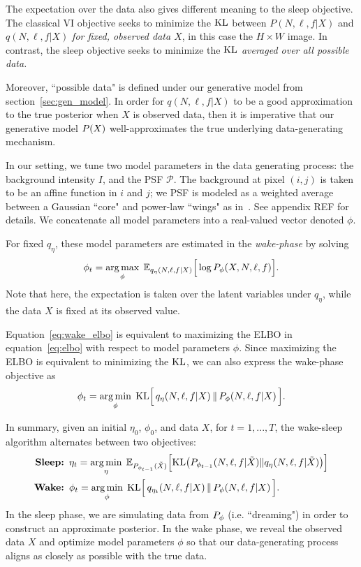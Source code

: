 The expectation over the data also gives different meaning to the sleep objective. The classical VI objective seeks to minimize the $\textrm{KL}$ between $P(N, \ell, f | X)$ and $q(N, \ell, f | X)$ {\itshape for fixed, observed data $X$}, 
in this case the $H\times W$ image. In contrast, the sleep objective seeks to minimize the $\textrm{KL}$ {\itshape averaged over all possible data. }

Moreover, ``possible data" is defined under our generative model from section~\ref{sec:gen_model}. In order for $q(N, \ell, f | X)$ to be a good approximation to
the true posterior when $X$ is observed data, then it is imperative that our generative model $P(X)$ well-approximates the true underlying data-generating mechanism. 

In our setting, we tune two model parameters in the data generating process: the background intensity $I$, and the PSF $\mathcal{P}$. The background at pixel $(i, j)$ is taken to be an affine function in $i$ and $j$; we PSF is modeled as a weighted average between a Gaussian ``core" and power-law ``wings" as in~\cite{Xin2018psf}. See appendix REF for details. We concatenate all model parameters into a real-valued vector denoted $\phi$. 

For fixed $q_\eta$, these model parameters are estimated in the {\itshape wake-phase} by solving 
\begin{align}
    \phi_{t} = \operatorname*{arg\,max}_{\phi} \; \mathbb{E}_{q_{\eta}(N, \ell, f | X)}\Big[\log P_\phi(X, N, \ell, f)\Big]. 
    \label{eq:wake_elbo}
\end{align}
Note that here, the expectation is taken over the latent variables under $q_\eta$, while the data $X$ is fixed at its observed value. 

Equation~\eqref{eq:wake_elbo} is equivalent to maximizing the ELBO in equation~\eqref{eq:elbo} with respect to model parameters $\phi$. 
Since maximizing the ELBO is equivalent to 
minimizing the $\textrm{KL}$, we can also express the wake-phase objective as 
\begin{align}
    \phi_{t} = \operatorname*{arg\,min}_{\phi} \; \mathrm{KL}\Big[\,q_\eta(N, \ell, f | X)\, \| \,P_\phi(N, \ell, f | X )\,\Big]. 
\end{align}

In summary, given an initial $\eta_0$, $\phi_0$, and data $X$,
for $t = 1, ..., T$, the wake-sleep algorithm alternates between two objectives: 
\begin{align}
    \text{{\bf Sleep: }} & 
    \eta_{t} = \operatorname*{arg\,min}_\eta \; \mathbb{E}_{P_{\phi_{t - 1}}(\tilde X)}\Big[\textrm{KL}\big ( P_{\phi_{t - 1}}(N, \ell, f | \tilde X)\| q_{\eta}(N, \ell, f |\tilde X)\big)\Big]
    \label{eq:sleep_kl}\\
    \text{{\bf Wake: }} & \phi_{t} =  \operatorname*{arg\,min}_{\phi} \; \mathrm{KL}\Big[\,q_{\eta_t}(N, \ell, f | X)\, \| \,P_\phi(N, \ell, f | X )\,\Big]. 
    \label{eq:wake_kl}
\end{align}
In the sleep phase, we are simulating data from $P_\phi$ (i.e. ``dreaming") in 
order to construct an approximate posterior. In the wake phase, we reveal the observed data $X$ and optimize model parameters $\phi$ so that our data-generating process aligns as closely as possible with the true data. 

